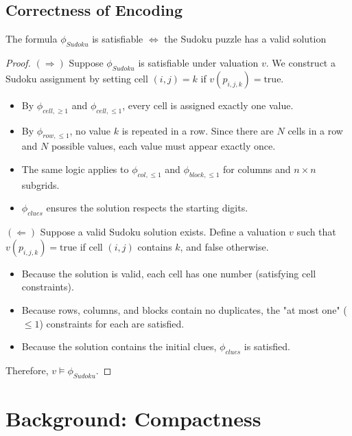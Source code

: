 \documentclass{article}
\newtheorem{theorem}{Theorem}[section]
\let\oldtheorem\theorem
\let\endoldtheorem\endtheorem
\renewenvironment{theorem}
  {\begin{tcolorbox}[
      colback=yellow!6,
      colframe=yellow!60!black,
      boxrule=0.6pt,
      arc=2pt,
      left=6pt,right=6pt,top=4pt,bottom=4pt,
      parbox=false
    ]\oldtheorem}
  {\endoldtheorem\end{tcolorbox}}
\begin{document}
\subsection*{Correctness of Encoding}

\begin{theorem}
    The formula $\phi_{Sudoku}$ is satisfiable $\iff$ the Sudoku puzzle has a valid solution
\end{theorem}

\begin{proof}
    $(\Rightarrow)$ Suppose $\phi_{Sudoku}$ is satisfiable under valuation $v$. We construct a Sudoku assignment by setting cell $(i, j) = k$ if $v(p_{i,j,k}) = \text{true}$. 
    \begin{itemize}
        \item By $\phi_{cell, \geq 1}$ and $\phi_{cell, \leq 1}$, every cell is assigned exactly one value. 
        \item By $\phi_{row, \leq 1}$, no value $k$ is repeated in a row. Since there are $N$ cells in a row and $N$ possible values, each value must appear exactly once. 
        \item The same logic applies to $\phi_{col, \leq 1}$ and $\phi_{block, \leq 1}$ for columns and $n \times n$ subgrids.
        \item $\phi_{clues}$ ensures the solution respects the starting digits.
    \end{itemize}

    $(\Leftarrow)$ Suppose a valid Sudoku solution exists. Define a valuation $v$ such that $v(p_{i,j,k}) = \text{true}$ if cell $(i,j)$ contains $k$, and false otherwise.
    \begin{itemize}
        \item Because the solution is valid, each cell has one number (satisfying cell constraints).
        \item Because rows, columns, and blocks contain no duplicates, the "at most one" ($\leq 1$) constraints for each are satisfied.
        \item Because the solution contains the initial clues, $\phi_{clues}$ is satisfied.
    \end{itemize}
    Therefore, $v \models \phi_{Sudoku}$.
\end{proof}

\section*{Background: Compactness}
\end{document}
